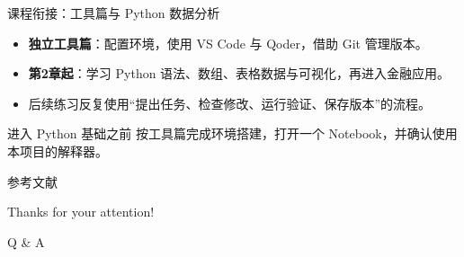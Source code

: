 \documentclass[9pt]{ctexbeamer}
\begin{document}
\begin{frame}{课程衔接：工具篇与 Python 数据分析}
  \begin{itemize}
    \item \textbf{独立工具篇}：配置环境，使用 VS Code 与 Qoder，借助 Git 管理版本。
    \item \textbf{第2章起}：学习 Python 语法、数组、表格数据与可视化，再进入金融应用。
    \item 后续练习反复使用“提出任务、检查修改、运行验证、保存版本”的流程。
  \end{itemize}
  \begin{block}{进入 Python 基础之前}
    按工具篇完成环境搭建，打开一个 Notebook，并确认使用本项目的解释器。
  \end{block}
\end{frame}

\appendix



\begin{frame}[allowframebreaks]{参考文献}
	
	 
\end{frame}

\begin{frame}
	\begin{center}
		{\Huge\calligra Thanks for your attention!}
		\vspace{1cm}
		
		{\Huge Q \& A}
	\end{center}
\end{frame}
\end{document}
